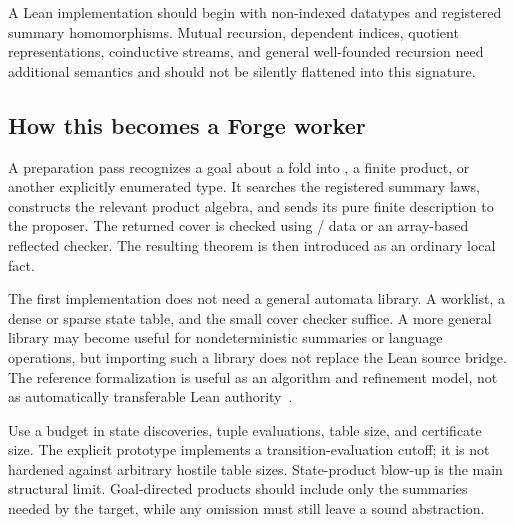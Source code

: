 A Lean implementation should begin with non-indexed datatypes and registered
summary homomorphisms. Mutual recursion, dependent indices, quotient
representations, coinductive streams, and general well-founded recursion need
additional semantics and should not be silently flattened into this signature.

\subsection{How this becomes a Forge worker}
A preparation pass recognizes a goal about a fold into , a finite
product, or another explicitly enumerated type. It searches the registered
summary laws, constructs the relevant product algebra, and sends its pure
finite description to the proposer. The returned cover is checked using
/ data or an array-based reflected checker. The
resulting theorem is then introduced as an ordinary local fact.

The first implementation does not need a general automata library. A worklist,
a dense or sparse state table, and the small cover checker suffice. A more
general library may become useful for nondeterministic summaries or language
operations, but importing such a library does not replace the Lean source
bridge. The reference formalization is useful as an algorithm and refinement
model, not as automatically transferable Lean authority~\cite{afp-tree}.

Use a budget in state discoveries, tuple evaluations, table size, and certificate
size. The explicit prototype implements a transition-evaluation cutoff; it is
not hardened against arbitrary hostile table sizes. State-product blow-up is the
main structural limit. Goal-directed products should include only the summaries
needed by the target, while any omission must still leave a sound abstraction.
